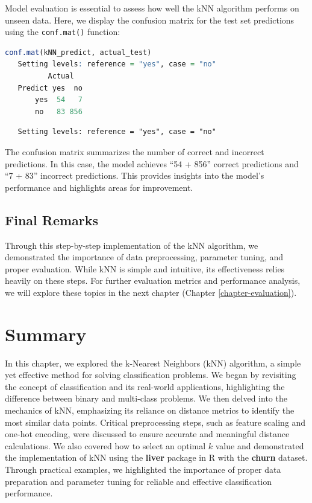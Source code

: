 \documentclass[
]{book}
\newcommand{\passthrough}[1]{#1}
\theoremstyle{definition}
\theoremstyle{definition}
\theoremstyle{definition}
\theoremstyle{definition}
\theoremstyle{remark}
\begin{document}
Model evaluation is essential to assess how well the kNN algorithm performs on unseen data. Here, we display the confusion matrix for the test set predictions using the \passthrough{\lstinline!conf.mat()!} function:

\begin{lstlisting}[language=R]
conf.mat(kNN_predict, actual_test)
   Setting levels: reference = "yes", case = "no"
          Actual
   Predict yes  no
       yes  54   7
       no   83 856
\end{lstlisting}

\begin{lstlisting}
   Setting levels: reference = "yes", case = "no"
\end{lstlisting}

The confusion matrix summarizes the number of correct and incorrect predictions. In this case, the model achieves ``54 + 856'' correct predictions and ``7 + 83'' incorrect predictions. This provides insights into the model's performance and highlights areas for improvement.

\subsection*{Final Remarks}\label{final-remarks}

Through this step-by-step implementation of the kNN algorithm, we demonstrated the importance of data preprocessing, parameter tuning, and proper evaluation. While kNN is simple and intuitive, its effectiveness relies heavily on these steps. For further evaluation metrics and performance analysis, we will explore these topics in the next chapter (Chapter \ref{chapter-evaluation}).

\section{Summary}\label{summary}

In this chapter, we explored the k-Nearest Neighbors (kNN) algorithm, a simple yet effective method for solving classification problems. We began by revisiting the concept of classification and its real-world applications, highlighting the difference between binary and multi-class problems. We then delved into the mechanics of kNN, emphasizing its reliance on distance metrics to identify the most similar data points. Critical preprocessing steps, such as feature scaling and one-hot encoding, were discussed to ensure accurate and meaningful distance calculations. We also covered how to select an optimal \(k\) value and demonstrated the implementation of kNN using the \textbf{liver} package in R with the \textbf{churn} dataset. Through practical examples, we highlighted the importance of proper data preparation and parameter tuning for reliable and effective classification performance.
\end{document}
